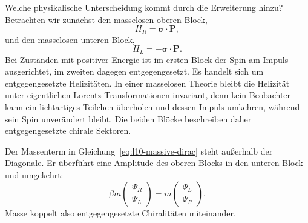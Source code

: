 Welche physikalische Unterscheidung kommt durch die Erweiterung hinzu? Betrachten wir zunächst den masselosen oberen Block,
\begin{equation}
H_R=\boldsymbol{\sigma}\cdot\mathbf P,
\end{equation}
und den masselosen unteren Block,
\begin{equation}
H_L=-\boldsymbol{\sigma}\cdot\mathbf P.
\end{equation}
Bei Zuständen mit positiver Energie ist im ersten Block der Spin am Impuls ausgerichtet, im zweiten dagegen entgegengesetzt. Es handelt sich um entgegengesetzte Helizitäten. In einer masselosen Theorie bleibt die Helizität unter eigentlichen Lorentz-Transformationen invariant, denn kein Beobachter kann ein lichtartiges Teilchen überholen und dessen Impuls umkehren, während sein Spin unverändert bleibt. Die beiden Blöcke beschreiben daher entgegengesetzte chirale Sektoren.

\begin{classroomqa}
\end{classroomqa}

Der Massenterm in Gleichung~\eqref{eq:l10-massive-dirac} steht außerhalb der Diagonale. Er überführt eine Amplitude des oberen Blocks in den unteren Block und umgekehrt:
\begin{equation}
\beta m
\begin{pmatrix}
\Psi_R\\
\Psi_L
\end{pmatrix}
=
m
\begin{pmatrix}
\Psi_L\\
\Psi_R
\end{pmatrix}.
\end{equation}
Masse koppelt also entgegengesetzte Chiralitäten miteinander.

\begin{classroomqa}
\end{classroomqa}

